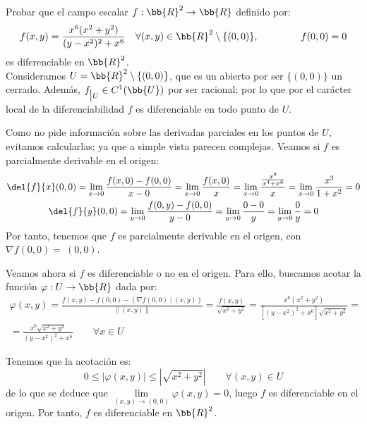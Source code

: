 \begin{ejercicio}
    Probar que el campo escalar $f:\bb{R}^2\to \bb{R}$ definido por:
    \begin{equation*}
        f(x,y)=\frac{x^6(x^2+y^2)}{(y-x^2)^2+x^6} \quad \forall (x,y)\in \bb{R}^2\setminus \{(0,0)\},\hspace{1.5cm} f(0,0)=0
    \end{equation*}
    es diferenciable en $\bb{R}^2$.\\

    Consideramos $U=\bb{R}^2\setminus \{(0,0)\}$, que es un abierto por ser $\{(0,0)\}$ un cerrado. Además, $f_{\big| U}\in C^1(\bb{U})$ por ser racional; por lo que por el carácter local de la diferenciabilidad $f$ es diferenciable en todo punto de $U$.

    Como no pide información sobre las derivadas parciales en los puntos de $U$, evitamos calcularlas; ya que a simple vista parecen complejas. Veamos si $f$ es parcialmente derivable en el origen:
    \begin{gather*}
        \del{f}{x}(0,0) = \lim_{x\to 0}\frac{f(x,0)-f(0,0)}{x-0} = \lim_{x\to 0}\frac{f(x,0)}{x} = \lim_{x\to 0}\frac{\frac{x^8}{x^4 + x^6}}{x}
        = \lim_{x\to 0}\frac{x^3}{1 + x^2}= 0 \\
        \del{f}{y}(0,0) = \lim_{y\to 0}\frac{f(0,y)-f(0,0)}{y-0} = \lim_{y\to 0}\frac{0-0}{y} = \lim_{y\to 0}\frac{0}{y} = 0
    \end{gather*}
    Por tanto, tenemos que $f$ es parcialmente derivable en el origen, con $\nabla f(0,0)=~(0,0)$.

    Veamos ahora si $f$ es diferenciable o no en el origen. Para ello, buscamos acotar la función $\varphi:U\to \bb{R}$ dada por:
    \begin{multline*}
        \varphi(x,y) = \frac{f(x,y)-f(0,0) - (\nabla f(0,0)\mid (x,y))}{\|(x,y)\|}
        = \frac{f(x,y)}{\sqrt{x^2+y^2}}
        = \frac{x^6(x^2+y^2)}{[(y-x^2)^2+x^6]\sqrt{x^2+y^2}} =\\
        = \frac{x^6\sqrt{x^2+y^2}}{(y-x^2)^2+x^6} \qquad \forall x\in U
    \end{multline*}

    Tenemos que la acotación es:
    \begin{equation*}
        0\leq |\varphi(x,y)| \leq |\sqrt{x^2+y^2}| \qquad \forall (x,y)\in U
    \end{equation*}
    de lo que se deduce que $\lim\limits_{(x,y)\to (0,0)} \varphi(x,y) = 0$, luego $f$ es diferenciable en el origen. Por tanto, $f$ es diferenciable en $\bb{R}^2$.
\end{ejercicio}


